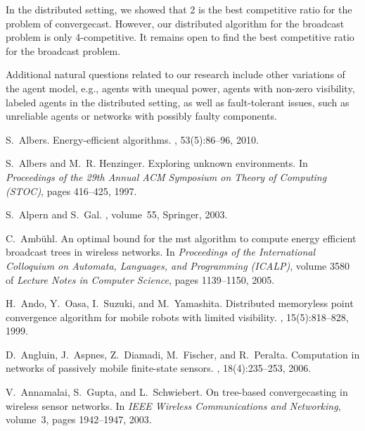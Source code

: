 \documentclass{article}
\begin{document}
In the distributed setting, we showed that 2 is the best competitive ratio for the problem of convergecast. However, our distributed algorithm for the broadcast problem is only 4-competitive. It remains open to find the best competitive ratio for the broadcast problem.

Additional natural questions related to our research include
other variations of the agent model, e.g., agents with unequal power, agents with non-zero visibility, labeled agents in the distributed setting, as well as fault-tolerant issues, such as unreliable agents or networks with possibly faulty components.




\begin{thebibliography}{10}

S.~Albers.
\newblock Energy-efficient algorithms.
, 53(5):86--96, 2010.

S.~Albers and M.~R. Henzinger.
\newblock Exploring unknown environments.
\newblock In {\em Proceedings of the 29th Annual ACM Symposium on
  Theory of Computing (STOC)}, pages 416--425, 1997.

S.~Alpern and S.~Gal.
, volume~55,
\newblock Springer, 2003.

C.~Ambühl.
\newblock An optimal bound for the mst algorithm to compute energy efficient
  broadcast trees in wireless networks.
\newblock In {\em Proceedings of the International Colloquium on Automata, Languages, and
  Programming (ICALP)}, volume 3580 of {\em Lecture Notes in Computer Science},
  pages 1139--1150, 2005.

H.~Ando, Y.~Oasa, I.~Suzuki, and M.~Yamashita.
\newblock Distributed memoryless point convergence algorithm for mobile robots
  with limited visibility.
, 15(5):818--828,
  1999.

D.~Angluin, J.~Aspnes, Z.~Diamadi, M.~Fischer, and R.~Peralta.
\newblock Computation in networks of passively mobile finite-state sensors.
, 18(4):235--253, 2006.

V.~Annamalai, S.~Gupta, and L.~Schwiebert.
\newblock On tree-based convergecasting in wireless sensor networks.
\newblock In {\em IEEE Wireless Communications and Networking}, volume~3, pages 1942--1947, 2003.


\end{thebibliography}
\end{document}
